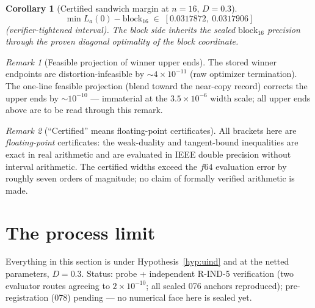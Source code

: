 \documentclass[11pt]{article}
\newtheorem{corollary}{Corollary}
\theoremstyle{definition}
\theoremstyle{remark}
\newtheorem{remark}{Remark}
\begin{document}
\begin{corollary}[Certified sandwich margin at $n=16$, $D=0.3$]
\label{cor:margin}
\[
\min L_a(0)-\mathrm{block}_{16}\;\in\;[0.0317872,\ 0.0317906]
\]
(verifier-tightened interval). The block side inherits the sealed
$\mathrm{block}_{16}$ precision through the \emph{proven} diagonal
optimality of the block coordinate.
\end{corollary}

\begin{remark}[Feasible projection of winner upper ends]
\label{rem:proj}
The stored winner endpoints are distortion-infeasible by
$\sim4\times10^{-11}$ (raw optimizer termination). The one-line
feasible projection (blend toward the near-copy record) corrects
the upper ends by $\sim10^{-10}$ --- immaterial at the
$3.5\times10^{-6}$ width scale; all upper ends above are to be read
through this remark.
\end{remark}

\begin{remark}[``Certified'' means floating-point certificates]
\label{rem:fpcert}
All brackets here are \emph{floating-point} certificates: the
weak-duality and tangent-bound inequalities are exact in real
arithmetic and are evaluated in IEEE double precision without
interval arithmetic. The certified widths exceed the $f64$
evaluation error by roughly seven orders of magnitude; no claim of
formally verified arithmetic is made.
\end{remark}

\section{The process limit}
\label{sec:proc}
Everything in this section is under Hypothesis~\ref{hyp:uind} and at
the netted parameters, $D=0.3$. Status: probe + independent R-IND-5
verification (two evaluator routes agreeing to $2\times10^{-10}$;
all sealed 076 anchors reproduced); pre-registration (078) pending
--- no numerical face here is sealed yet.
\end{document}
